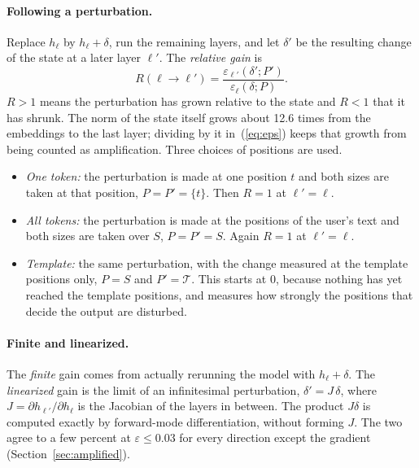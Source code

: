 \documentclass[11pt]{article}
\newcommand{\cT}{\mathcal{T}}
\begin{document}
\paragraph{Following a perturbation.} Replace $h_\ell$ by $h_\ell+\delta$, run the remaining layers, and let $\delta'$ be the resulting change of the state at a later layer $\ell'$. The \emph{relative gain} is
\begin{equation}
R(\ell\to\ell')=\frac{\varepsilon_{\ell'}(\delta';P')}{\varepsilon_\ell(\delta;P)} .
\label{eq:gain}
\end{equation}
$R>1$ means the perturbation has grown relative to the state and $R<1$ that it has shrunk. The norm of the state itself grows about 12.6 times from the embeddings to the last layer; dividing by it in~(\ref{eq:eps}) keeps that growth from being counted as amplification. Three choices of positions are used.
\begin{itemize}
\item \emph{One token:} the perturbation is made at one position $t$ and both sizes are taken at that position, $P=P'=\{t\}$. Then $R=1$ at $\ell'=\ell$.
\item \emph{All tokens:} the perturbation is made at the positions of the user's text and both sizes are taken over $S$, $P=P'=S$. Again $R=1$ at $\ell'=\ell$.
\item \emph{Template:} the same perturbation, with the change measured at the template positions only, $P=S$ and $P'=\cT$. This starts at 0, because nothing has yet reached the template positions, and measures how strongly the positions that decide the output are disturbed.
\end{itemize}

\paragraph{Finite and linearized.} The \emph{finite} gain comes from actually rerunning the model with $h_\ell+\delta$. The \emph{linearized} gain is the limit of an infinitesimal perturbation, $\delta'=J\,\delta$, where $J=\partial h_{\ell'}/\partial h_\ell$ is the Jacobian of the layers in between. The product $J\delta$ is computed exactly by forward-mode differentiation, without forming $J$. The two agree to a few percent at $\varepsilon\le 0.03$ for every direction except the gradient (Section~\ref{sec:amplified}).
\end{document}
